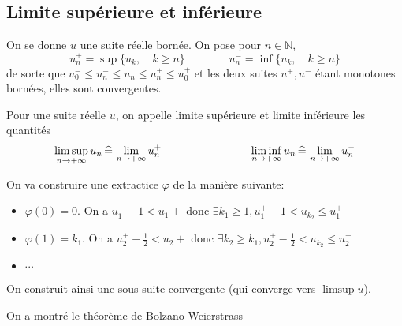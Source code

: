 \subsection{Limite supérieure et inférieure}

On se donne $u$ une suite réelle bornée. On pose pour $n\in\mathbb N$, \[
    u_n^+=\sup\{u_k, \quad k\geq n\}\qquad \qquad u_n^-=\inf \{u_k,\quad k\geq n\}
\]
de sorte que $u_0^-\leq u_n^-\leq u_n\leq u_n^+\leq u_0^+$ et les deux suites $u^+, u^-$ étant monotones bornées, elles sont convergentes.

\begin{dfn}
    Pour une suite réelle $u$, on appelle limite supérieure et limite inférieure les quantités \[
        \limsup_{n\to+\infty}u_n\,\widehat=\,\lim_{n\to+\infty}u_n^+\qquad\qquad\qquad\qquad \liminf_{n\to+\infty}u_n\,\widehat=\,\lim_{n\to+\infty}u_n^-
    \]
\end{dfn}

On va construire une extractice $\varphi$ de la manière suivante: \begin{itemize}
    \item $\varphi(0)=0$. On a $u_1^+-1<u_1+$ donc $\exists k_1\geq 1, u_1^+-1<u_{k_2}\leq u_1^+$
    \item $\varphi(1)=k_1$. On a $u_2^+-\frac12<u_2+$ donc $\exists k_2\geq k_1, u_2^+-\frac12<u_{k_2}\leq u_2^+$
    \item $\cdots$
\end{itemize}
On construit ainsi une sous-suite convergente (qui converge vers $\limsup u$).

\begin{rem}
    On a montré le théorème de Bolzano-Weierstrass
\end{rem}
